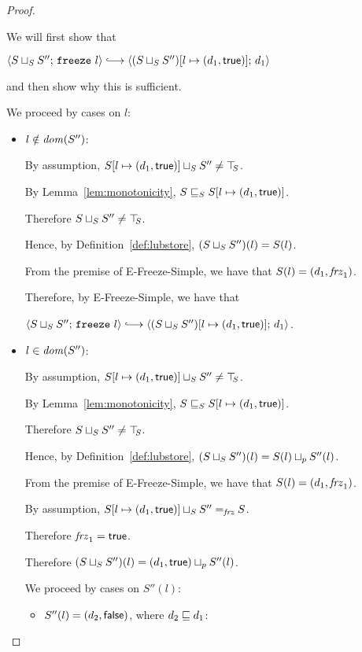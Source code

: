 \begin{proof}
\begin{itemize}
      We will first show that

      $\config{\lubstore{S}{S''}}{\freeze{l}} \parstepsto
      \config{\extS{(\lubstore{S}{S''})}{l}{d_1}{\frozentrue}}{d_1}$

      and then show why this is sufficient.

      We proceed by cases on $l$:
      \begin{itemize}
      \item $l \notin \mathit{dom}(S'')$:

        By assumption, $S[l \mapsto (d_1, \textsf{true})] \sqcup_{S} S''
        \neq \top\hspace{-0.85mm}_{S}$.

        By Lemma~\ref{lem:monotonicity},
        $S \sqsubseteq_S S[l \mapsto (d_1, \textsf{true})]$.

        Therefore $S \sqcup_{S} S'' \neq \top\hspace{-0.85mm}_{S}$.

        Hence, by Definition~\ref{def:lubstore},
        $(S \sqcup_{S} S'')(l) = S(l)$.

        From the premise of {\sc E-Freeze-Simple}, we have that
        $S(l) = (d_1, \mathit{frz}_1)$.

        Therefore, by {\sc E-Freeze-Simple}, we have that

        $\config{\lubstore{S}{S''}}{\freeze{l}}
        \parstepsto
        \config{\extS{(\lubstore{S}{S''})}{l}{d_1}{\frozentrue}}{d_1}$.

      \item $l \in \mathit{dom}(S'')$:

        By assumption, $S[l \mapsto (d_1, \textsf{true})] \sqcup_{S} S''
        \neq \top\hspace{-0.85mm}_{S}$.

        By Lemma~\ref{lem:monotonicity},
        $S \sqsubseteq_S S[l \mapsto (d_1, \textsf{true})]$.

        Therefore $S \sqcup_{S} S'' \neq \top\hspace{-0.85mm}_{S}$.

        Hence, by Definition~\ref{def:lubstore},
        $(S \sqcup_{S} S'')(l) = S(l) \sqcup_p S''(l)$.

        From the premise of {\sc E-Freeze-Simple}, we have that
        $S(l) = (d_1, \mathit{frz}_1)$.

        By assumption, $S[l \mapsto (d_1, \textsf{true})] \sqcup_{S} S''
        =_{\textit{frz}} S$.

        Therefore $\mathit{frz}_1 = \textsf{true}$.

        Therefore $(S \sqcup_{S} S'')(l) =
        (d_1, \textsf{true}) \sqcup_p S''(l)$.

        We proceed by cases on $S''(l)$:
        \begin{itemize}
        \item $S''(l) = (d_2, \textsf{false})$, where $d_2 \sqsubseteq d_1$:


\end{itemize}
\end{itemize}
\end{itemize}
\end{proof}
